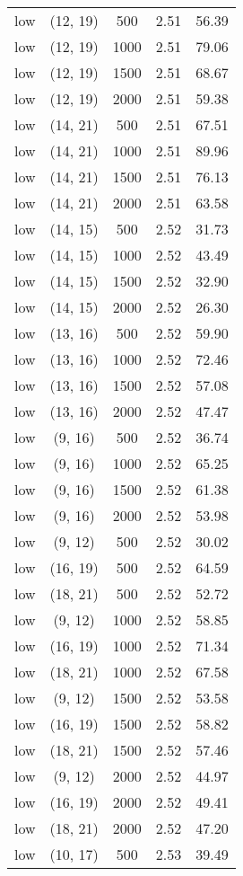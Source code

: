 \begin{tabular}{c c c c c}
low & (12, 19) &  500 & 2.51 & 56.39 \\
low & (12, 19) &  1000 & 2.51 & 79.06 \\
low & (12, 19) &  1500 & 2.51 & 68.67 \\
low & (12, 19) &  2000 & 2.51 & 59.38 \\
low & (14, 21) &  500 & 2.51 & 67.51 \\
low & (14, 21) &  1000 & 2.51 & 89.96 \\
low & (14, 21) &  1500 & 2.51 & 76.13 \\
low & (14, 21) &  2000 & 2.51 & 63.58 \\
low & (14, 15) &  500 & 2.52 & 31.73 \\
low & (14, 15) &  1000 & 2.52 & 43.49 \\
low & (14, 15) &  1500 & 2.52 & 32.90 \\
low & (14, 15) &  2000 & 2.52 & 26.30 \\
low & (13, 16) &  500 & 2.52 & 59.90 \\
low & (13, 16) &  1000 & 2.52 & 72.46 \\
low & (13, 16) &  1500 & 2.52 & 57.08 \\
low & (13, 16) &  2000 & 2.52 & 47.47 \\
low & (9, 16) &  500 & 2.52 & 36.74 \\
low & (9, 16) &  1000 & 2.52 & 65.25 \\
low & (9, 16) &  1500 & 2.52 & 61.38 \\
low & (9, 16) &  2000 & 2.52 & 53.98 \\
low & (9, 12) &  500 & 2.52 & 30.02 \\
low & (16, 19) &  500 & 2.52 & 64.59 \\
low & (18, 21) &  500 & 2.52 & 52.72 \\
low & (9, 12) &  1000 & 2.52 & 58.85 \\
low & (16, 19) &  1000 & 2.52 & 71.34 \\
low & (18, 21) &  1000 & 2.52 & 67.58 \\
low & (9, 12) &  1500 & 2.52 & 53.58 \\
low & (16, 19) &  1500 & 2.52 & 58.82 \\
low & (18, 21) &  1500 & 2.52 & 57.46 \\
low & (9, 12) &  2000 & 2.52 & 44.97 \\
low & (16, 19) &  2000 & 2.52 & 49.41 \\
low & (18, 21) &  2000 & 2.52 & 47.20 \\
low & (10, 17) &  500 & 2.53 & 39.49 \\

\end{tabular}
